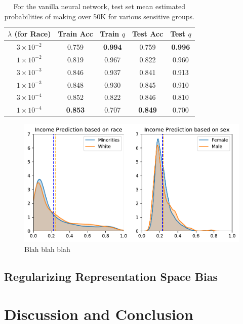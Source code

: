 \documentclass{article}
\begin{document}
\begin{table}[h]
\centering
\begin{tabular}{c|cc |cc} 
 \hline
 \hline
 $\lambda$ (for Race) & Train Acc & Train $q$ & Test Acc & Test $q$ \\ 
 \hline
 $3 \times 10^{-2}$ & 0.759 & \textbf{0.994} & 0.759 & \textbf{0.996}\\
 $1 \times 10^{-2}$ &0.819 & 0.967 & 0.822 & 0.960\\
$3 \times 10^{-3}$ & 0.846 & 0.937 & 0.841 & 0.913\\
$1 \times 10^{-3}$ &0.848 &0.930 &  0.845 &0.910 \\
$3 \times 10^{-4}$ & 0.852 & 0.822 & 0.846 & 0.810\\
$1 \times 10^{-4}$ & \textbf{0.853} & 0.707 & \textbf{0.849} & 0.700\\
 \hline
\end{tabular}
\caption{For the vanilla neural network, test set mean estimated probabilities of making over 50K for various sensitive groups.} \label{boundary-table-race}
\end{table}

\begin{figure}[ht]
\vskip 0.2in
\begin{center}
\centerline{\includegraphics[width=\columnwidth]{img/boundary-bias.pdf}}
\caption{Blah blah blah}
\label{vanilla-nn}
\end{center}
\vskip -0.2in
\end{figure}


  

\subsection{Regularizing Representation Space Bias}

\section{Discussion and Conclusion}
\end{document}
